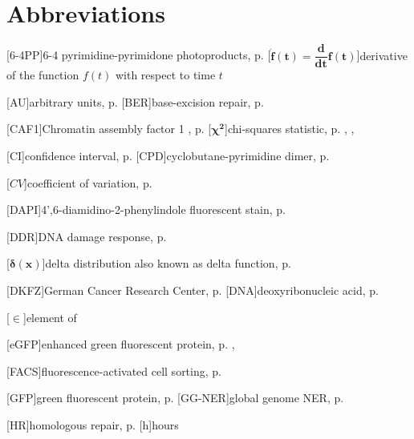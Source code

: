 
\chapter{Abbreviations}
\begin{acronym}



[6-4PP]{6-4 pyrimidine-pyrimidone photoproducts, p. \pageref{sec:intro_reg_repair}}
[$\boldsymbol{\dot{f}(t) = \dfrac{d}{dt}f(t)}$]{derivative of the function $ 
f(t) $ with respect to time $ t $}



[AU]{arbitrary units, p. \pageref{a.u.}}
[BER]{base-excision repair, p. \pageref{sec:intro_reg_repair}}


[CAF1]{Chromatin assembly factor 1 , p. \pageref{sec:NERmechanism}}
[$\boldsymbol{\chi^{2}}$]{chi-squares statistic, p. \pageref{chi_Neyman}, \pageref{chi_square}, \pageref{chi_square2}}

[CI]{confidence interval, p. \pageref{def_CI}}
[CPD]{cyclobutane-pyrimidine dimer, p. \pageref{sec:intro_reg_repair}}

[$\boldsymbol{ \mathit{CV} }$]{coefficient of variation, p. \pageref{CV}}

[DAPI]{4',6-diamidino-2-phenylindole fluorescent stain, p. \pageref{DAPI}}

[DDR]{DNA damage response, p. \pageref{sec:intro_DDR}}


[$\boldsymbol{\delta(x)}$]{delta distribution also known as delta function, p. 
\pageref{delta_fct}}


[DKFZ]{German Cancer Research Center, p. \pageref{DKFZ}}
[DNA]{deoxyribonucleic acid, p. \pageref{sec:intro_DNAdamage}}


[$\boldsymbol{\in}$]{element of}



[eGFP]{enhanced green fluorescent protein, p. \pageref{eGFP}}
, 

[FACS]{fluorescence-activated cell sorting, p. \pageref{FACS}}


[GFP]{green fluorescent protein, p. \pageref{sec:NERmechanism}}
[GG-NER]{global genome NER, p. \pageref{sec:NERmechanism}}

[HR]{homologous repair, p. \pageref{sec:intro_reg_repair}}
[h]{hours}


\end{acronym}
